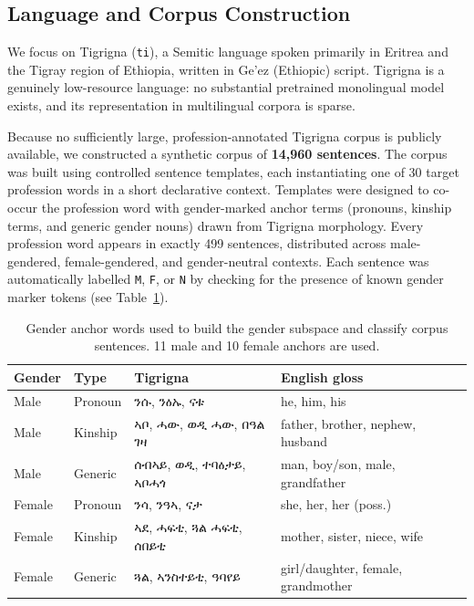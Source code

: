 \documentclass[11pt,a4paper]{article}
\begin{document}
\subsection{Language and Corpus Construction}

We focus on Tigrigna (\texttt{ti}), a Semitic language spoken primarily in
Eritrea and the Tigray region of Ethiopia, written in Ge'ez (Ethiopic) script.
Tigrigna is a genuinely low-resource language: no substantial pretrained
monolingual model exists, and its representation in multilingual corpora is
sparse.

Because no sufficiently large, profession-annotated Tigrigna corpus is publicly
available, we constructed a synthetic corpus of \textbf{14{,}960 sentences}.
The corpus was built using controlled sentence templates, each instantiating one
of 30 target profession words in a short declarative context. Templates were
designed to co-occur the profession word with gender-marked anchor terms
(pronouns, kinship terms, and generic gender nouns) drawn from Tigrigna
morphology. Every profession word appears in exactly 499 sentences, distributed
across male-gendered, female-gendered, and gender-neutral contexts. Each
sentence was automatically labelled \texttt{M}, \texttt{F}, or \texttt{N} by
checking for the presence of known gender marker tokens
(see Table~\ref{tab:anchors}).

\begin{table}[h]
\centering
\small
\begin{tabular}{llll}
\toprule
\textbf{Gender} & \textbf{Type} & \textbf{Tigrigna} & \textbf{English gloss} \\
\midrule
Male   & Pronoun & ንሱ, ንዕኡ, ናቱ             & he, him, his \\
Male   & Kinship & ኣቦ, ሓው, ወዲ ሓው, በዓል ገዛ  & father, brother, nephew, husband \\
Male   & Generic & ሰብኣይ, ወዲ, ተባዕታይ, ኣቦሓጎ & man, boy/son, male, grandfather \\
\midrule
Female & Pronoun & ንሳ, ንዓኣ, ናታ            & she, her, her (poss.) \\
Female & Kinship & ኣደ, ሓፍቲ, ጓል ሓፍቲ, ሰበይቲ & mother, sister, niece, wife \\
Female & Generic & ጓል, ኣንስተይቲ, ዓባየይ       & girl/daughter, female, grandmother \\
\bottomrule
\end{tabular}
\caption{Gender anchor words used to build the gender subspace and classify
corpus sentences. 11 male and 10 female anchors are used.}
\label{tab:anchors}
\end{table}
\end{document}
